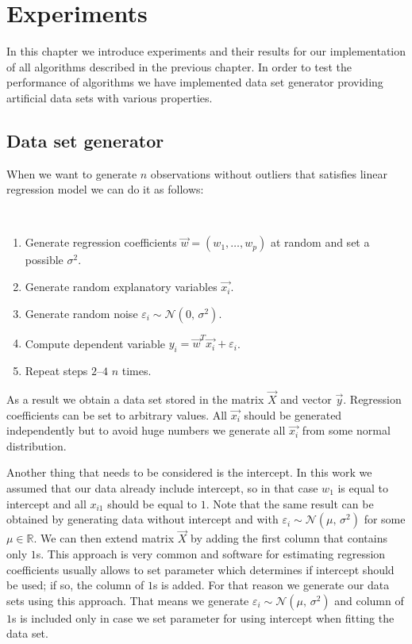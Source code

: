 \chapter{Experiments} \label{chapterexperiments}
In this chapter we introduce experiments and their results for our implementation of all algorithms described in the previous chapter.
In order to test the performance of algorithms we have implemented data set generator providing artificial data sets with various properties.

\section{Data set generator}
When we want to generate $n$ observations without outliers that satisfies linear regression model we can do it as follows:

\begin{algo} \label{generate:linear:model}
    \mbox{}\vspace{\dimexpr-\baselineskip-\topsep}
\\
    \begin{enumerate}
        \item Generate regression coefficients $\vec{w} = (w_1, \ldots, w_p)$ at random and set a possible $\sigma^{2}$.
        \item Generate random explanatory variables $\vec{x_i}$.
        \item Generate random noise $\varepsilon_i \sim \mathcal{N}(0,\,\sigma^{2})$.
        \item Compute dependent variable $y_i = \vec{w}^T\vec{x_i} + \varepsilon_i$.
        \item Repeat steps $2$--$4$ $n$ times.
    \end{enumerate}
\end{algo}
As a result we obtain a data set stored in the matrix $\vec{X}$ and vector $\vec{y}$. Regression coefficients can be set to arbitrary values. All $\vec{x_i}$ should be generated independently but to avoid huge numbers we generate all $\vec{x_i}$ from some normal distribution. 

Another thing that needs to be considered is the intercept. In this work we assumed that our data already include intercept, so in that case $w_1$ is equal to intercept and all $x_{i1}$ should be equal to $1$. Note that the same result can be obtained by generating data without intercept and with $\varepsilon_i \sim \mathcal{N}(\mu,\,\sigma^{2})$ for some $\mu \in \mathbb{R}$. We can then extend matrix $\vec{X}$ by adding the first column that contains only $1$s. This approach is very common and software for estimating regression coefficients usually allows to set parameter which determines if intercept should be used; if so, the column of $1$s is added. For that reason we generate our data sets using this approach. That means we generate $\varepsilon_i \sim \mathcal{N}(\mu,\,\sigma^{2})$ and column of $1$s is included only in case we set parameter for using intercept when fitting the data set. 

